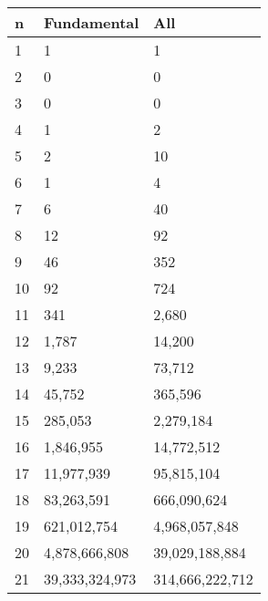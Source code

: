 \begin{table}[H]
\centering
\begin{tabular}{|l||l|l|}
\hline
n  & Fundamental            & All                     \\ \hline \hline
1  & 1                      & 1                       \\ \hline
2  & 0                      & 0                       \\ \hline
3  & 0                      & 0                       \\ \hline
4  & 1                      & 2                       \\ \hline
5  & 2                      & 10                      \\ \hline
6  & 1                      & 4                       \\ \hline
7  & 6                      & 40                      \\ \hline
8  & 12                     & 92                      \\ \hline
9  & 46                     & 352                     \\ \hline
10 & 92                     & 724                     \\ \hline
11 & 341                    & 2,680                   \\ \hline
12 & 1,787                  & 14,200                  \\ \hline
13 & 9,233                  & 73,712                  \\ \hline
14 & 45,752                 & 365,596                 \\ \hline
15 & 285,053                & 2,279,184               \\ \hline
16 & 1,846,955              & 14,772,512              \\ \hline
17 & 11,977,939             & 95,815,104              \\ \hline
18 & 83,263,591             & 666,090,624             \\ \hline
19 & 621,012,754            & 4,968,057,848           \\ \hline
20 & 4,878,666,808          & 39,029,188,884          \\ \hline
21 & 39,333,324,973         & 314,666,222,712         \\ \hline

\end{tabular}
\end{table}
